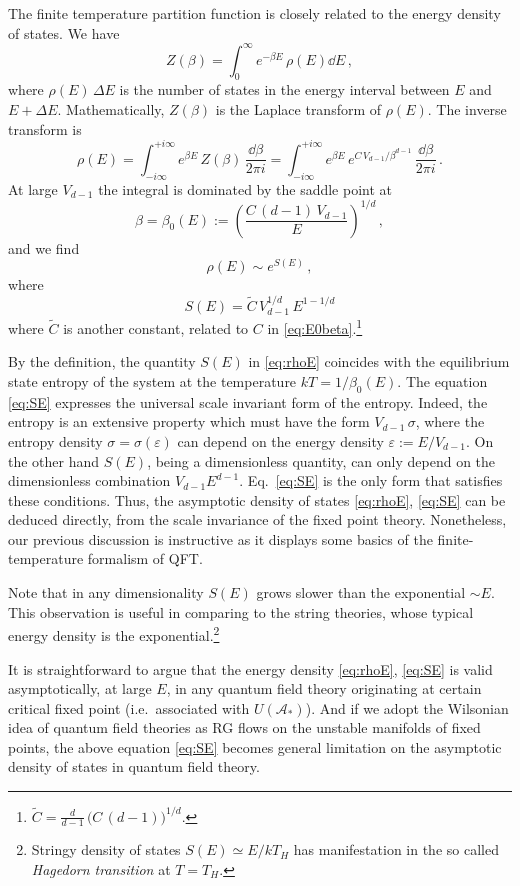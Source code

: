 The finite temperature partition function is closely related to the energy density
of states. We have
\[
Z(\beta)=\int_0^\infty e^{-\beta E}\,\rho(E)\dd E\,,
\]
where $\rho(E)\,\Delta E$ is the number of states in the energy interval between
$E$ and $E+\Delta E$. Mathematically, $Z(\beta)$ is the Laplace transform of
$\rho(E)$. The inverse transform is
\[
\rho(E)=\int_{-i\infty}^{+i\infty}e^{\beta E}\,Z(\beta)\,\frac{\dd\beta}{2\pi i}
=\int_{-i\infty}^{+i\infty}e^{\beta E}\,e^{C\,V_{d-1}/\beta^{d-1}}\,\frac{\dd\beta}{2\pi i}\,.
\]
At large $V_{d-1}$ the integral is dominated by the saddle point at
\[
\beta=\beta_0(E):=\left(\frac{C\,(d-1)\,V_{d-1}}E\right)^{1/d}\,,
\]
and we find
\begin{equation}\label{eq:rhoE}
\rho(E)\sim e^{S(E)}\,,
\end{equation}
where
\begin{equation}\label{eq:SE}
S(E)=\tilde C\,V_{d-1}^{1/d}\,E^{1-1/d}
\end{equation}
where $\tilde C$ is another constant, related to $C$ in
\eqref{eq:E0beta}.\footnote{$\tilde C=\frac d{d-1}\,\bigl(C\,(d-1)\bigr)^{1/d}$.}

By the definition, the quantity $S(E)$ in \eqref{eq:rhoE} coincides with the
equilibrium state entropy of the system at the temperature $kT=1/\beta_0(E)$. The
equation \eqref{eq:SE} expresses the universal scale invariant form of the entropy.
Indeed, the entropy is an extensive property which must have the form
$V_{d-1}\,\sigma$, where the entropy density $\sigma=\sigma(\varepsilon)$ can depend
on the energy density $\varepsilon:=E/V_{d-1}$. On the other hand $S(E)$, being a
dimensionless quantity, can only depend on the dimensionless combination
$V_{d-1}E^{d-1}$. Eq.~\eqref{eq:SE} is the only form that satisfies these
conditions. Thus, the asymptotic density of states \eqref{eq:rhoE}, \eqref{eq:SE}
can be deduced directly, from the scale invariance of the fixed point theory.
Nonetheless, our previous discussion is instructive as it displays some basics of
the finite-temperature formalism of QFT.

Note that in any dimensionality $S(E)$ grows slower than the exponential $\sim E$.
This observation is useful in comparing to the string theories, whose typical
energy density is the exponential.\footnote{Stringy density of states
$S(E)\simeq E/kT_H$ has manifestation in the so called \emph{Hagedorn transition}
at $T=T_H$.}

It is straightforward to argue that the energy density \eqref{eq:rhoE},
\eqref{eq:SE} is valid asymptotically, at large $E$, in any quantum field theory
originating at certain critical fixed point (i.e.\ associated with
$U(\mathcal A_*)$). And if we adopt the Wilsonian idea of quantum field theories as
RG flows on the unstable manifolds of fixed points, the above equation \eqref{eq:SE}
becomes general limitation on the asymptotic density of states in quantum field
theory.

